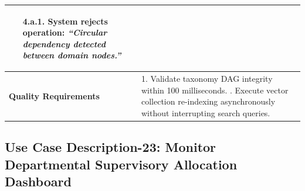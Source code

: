 \begin{table}[H]
\begin{tabularx}{\textwidth}{|l|X|}
\begin{itemize}[leftmargin=*]
    \begin{itemize}[leftmargin=*]
        \item[4.a.1.] System rejects operation: \textit{``Circular dependency detected between domain nodes.''}
    \end{itemize}
\end{itemize} \\ \hline
\textbf{Quality Requirements} & 
1. Validate taxonomy DAG integrity within 100 milliseconds. \newline
2. Execute vector collection re-indexing asynchronously without interrupting search queries. \\ \hline
\end{tabularx}
\end{table}

\clearpage
\subsection{Use Case Description-23: Monitor Departmental Supervisory Allocation Dashboard}
\label{subsec:uc23}

